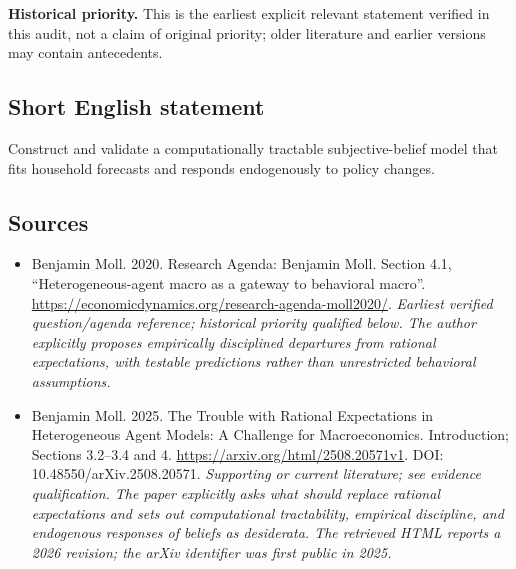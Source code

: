 \documentclass[11pt]{article}
\begin{document}
\par\textbf{Historical priority.} This is the earliest explicit relevant statement verified in this audit, not a claim of original priority; older literature and earlier versions may contain antecedents.

\subsection{Short English statement}
Construct and validate a computationally tractable subjective-belief model that fits household forecasts and responds endogenously to policy changes.

\subsection{Sources}
\begin{itemize}\raggedright
\item[\textnormal{[S1]}]\hypertarget{source:30007514:1}{} Benjamin Moll. 2020. Research Agenda: Benjamin Moll. Section 4.1, “Heterogeneous-agent macro as a gateway to behavioral macro”.
\url{https://economicdynamics.org/research-agenda-moll2020/}.
{\small\textit{Earliest verified question/agenda reference; historical priority qualified below. The author explicitly proposes empirically disciplined departures from rational expectations, with testable predictions rather than unrestricted behavioral assumptions.}}

\item[\textnormal{[S2]}]\hypertarget{source:30007514:2}{} Benjamin Moll. 2025. The Trouble with Rational Expectations in Heterogeneous Agent Models: A Challenge for Macroeconomics. Introduction; Sections 3.2–3.4 and 4.
\url{https://arxiv.org/html/2508.20571v1}.
DOI: 10.48550/arXiv.2508.20571.
{\small\textit{Supporting or current literature; see evidence qualification. The paper explicitly asks what should replace rational expectations and sets out computational tractability, empirical discipline, and endogenous responses of beliefs as desiderata. The retrieved HTML reports a 2026 revision; the arXiv identifier was first public in 2025.}}
\end{itemize}
\end{document}
